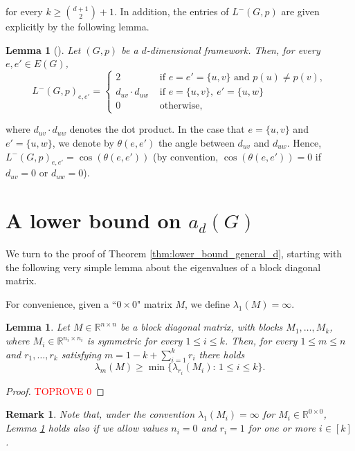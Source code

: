 \documentclass[a4paper,11pt]{article}
\theoremstyle{plain}
\newtheorem{remark}[theorem]{\bf Remark}
\newtheorem{lemma}[theorem]{\bf Lemma}
\theoremstyle{definition}
\newcommand{\Rea}{{\mathbb R}}
\begin{document}
for every $k\geq \binom{d+1}{2}+1$. In addition, the entries of $L^{-}(G,p)$ are given explicitly by the following lemma.
\begin{lemma}[{\cite[Lemma 2.1]{lew2022d}}]
\label{lemma:down_laplacian}
Let $(G,p)$ be a $d$-dimensional framework. Then, for every $e,e'\in E(G)$,
\[
    L^{-}(G,p)_{e,e'}= \begin{cases}
                    2 & \text{ if } e=e'=\{u,v\} \text{ and } p(u)\neq p(v),\\
  d_{uv}\cdot d_{uw} & \text{ if } e=\{u,v\},~e'=\{u,w\} \\
                    0 & \text{ otherwise,}
                    \end{cases} 
\]
\end{lemma}
where $d_{uv}\cdot d_{uw}$ denotes the dot product. In the case that $e=\{u,v\}$ and $e'=\{u,w\}$, we denote by
$\theta(e,e')$ the angle between $d_{uv}$ and $d_{uw}$. Hence,  
    $L^{-}(G,p)_{e,e'}=\cos(\theta(e,e'))$ (by convention, $\cos(\theta(e,e'))=0$ if $d_{uv}=0$ or $d_{uw}=0$).



\section{A lower bound on $a_d(G)$}\label{sec:lower_bound}


We turn to the proof of Theorem \ref{thm:lower_bound_general_d}, starting with the following very simple lemma about the eigenvalues of a block diagonal matrix.

For convenience, given a ``$0\times 0$" matrix $M$, we define $\lambda_1(M)=\infty$. 

\begin{lemma}\label{lemma:block_diagonal}
Let $M\in\Rea^{n\times n}$ be a block diagonal matrix, with blocks $M_1,\ldots,M_k$, where $M_i\in \Rea^{n_i\times n_i}$ is symmetric for every $1\leq i\leq k$. Then, for every $1\leq m\leq n$ and $r_1,\ldots, r_k$ satisfying $m=1-k+\sum_{i=1}^k r_i$ there holds
\[
\lambda_m(M)\geq \min \{ \lambda_{r_i}(M_i) : \, 1\leq i\leq k\}.
\]
\end{lemma}
\begin{proof}\textcolor{red}{TOPROVE 0}\end{proof}
\begin{remark}
    Note that, under the convention $\lambda_1(M_i)=\infty$ for $M_i\in \Rea^{0\times 0}$, Lemma \ref{lemma:block_diagonal} holds 
     also if we allow values $n_i=0$ and $r_i=1$ for one or more $i\in[k]$.
\end{remark}
\end{document}
